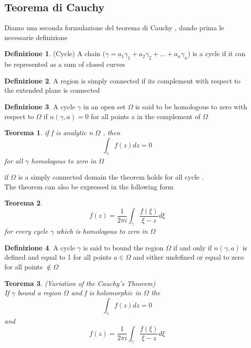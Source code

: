 \documentclass{article}
\newtheorem{teorema}{Teorema}[subsection]
\theoremstyle{definition}
\newtheorem*{definizione}{Definizione}
\begin{document}
\subsection{Teorema di Cauchy}
Diamo una seconda formulazione del teorema di Cauchy , dando prima le necessarie definizione
\begin{definizione}(Cycle)
	A chain ($\gamma=a_1\gamma_1+a_2\gamma_2+\dots+a_n\gamma_n$) is a cycle if it can be represented as a sum of  closed curves
\end{definizione}
\begin{definizione}
	A region is simply connected if its complement with  respect to the extended plane is connected 
\end{definizione}
\begin{definizione}
	A cycle $\gamma$ in an open set $\Omega$ is said to be homologous to zero with respect to $\Omega$ if $n(\gamma,a)=0$ for all points a in the complement of $\Omega$
\end{definizione}
\begin{teorema}
	if f is analytic n $\Omega$ , then $$\int_\gamma f(z)dz=0 $$ for all $\gamma$ homologous to zero in $\Omega$
\end{teorema}
if $\Omega$ is a simply connected domain the theorem holds for all cycle  . \\ The theorem can also be expressed in the following form 
\begin{teorema}
	$$f(z)=\frac{1}{2\pi i}\int_{\gamma}\frac{f(\xi)}{\xi-z}d\xi$$
for every cycle $\gamma$ which is homologous to zero in $\Omega$
\end{teorema}
\begin{definizione}
	A cycle $\gamma$ is said to bound the region $\Omega$ if and only if $n(\gamma,a)$ is defined and equal to 1 for all points $a \in \Omega$ and either undefined or equal to zero for all points $\notin \Omega$ 
\end{definizione}
\begin{teorema}(Variation of the Cauchy's Theorem) \\
	If $\gamma$ bound a region $\Omega$ and f is holomorphic in $\Omega$ the 
	$$\int_\gamma f(z)dz=0$$
	and
	$$f(z)=\frac{1}{2\pi i}\int_{\gamma}\frac{f(\xi)}{\xi-z}d\xi$$
\end{teorema}
\end{document}
